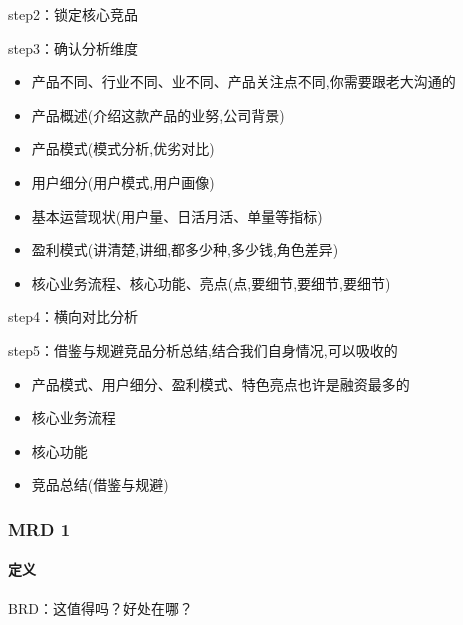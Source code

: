 \documentclass[letterpaper,11pt,english]{sphinxmanual}
\begin{document}
step2：锁定核心竞品

step3：确认分析维度
\begin{itemize}
\item {} 
产品不同、行业不同、业不同、产品关注点不同,你需要跟老大沟通的

\item {} 
产品概述(介绍这款产品的业努,公司背景)

\item {} 
产品模式(模式分析,优劣对比)

\item {} 
用户细分(用户模式,用户画像)

\item {} 
基本运营现状(用户量、日活月活、单量等指标)

\item {} 
盈利模式(讲清楚,讲细,都多少种,多少钱,角色差异)

\item {} 
核心业务流程、核心功能、亮点(点,要细节,要细节,要细节)

\end{itemize}

step4：横向对比分析

step5：借鉴与规避竞品分析总结,结合我们自身情况,可以吸收的
\begin{itemize}
\item {} 
产品模式、用户细分、盈利模式、特色亮点也许是融资最多的

\item {} 
核心业务流程

\item {} 
核心功能

\item {} 
竞品总结(借鉴与规避)

\end{itemize}


\subsubsection{MRD 1\sphinxfootnotemark[177]}
\label{\detokenize{chapter_skill/MRD:mrd-1}}\label{\detokenize{chapter_skill/MRD::doc}}%
\begin{footnotetext}[177]\sphinxAtStartFootnote
{}
%
\end{footnotetext}\ignorespaces 

\paragraph{定义}
\label{\detokenize{chapter_skill/MRD:id1}}
BRD：这值得吗？好处在哪？
\end{document}
